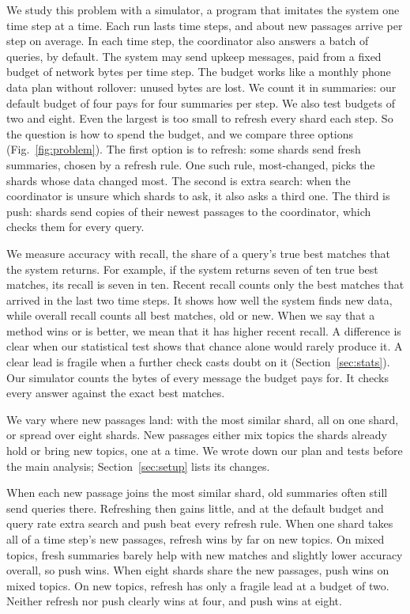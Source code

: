 We study this problem with a simulator, a program that imitates the system one time step at a time.
Each run lasts \RNumNumEpochs{} time steps, and about \RNumSteadyEpochInsertVecs{} new passages arrive per step on average.
In each time step, the coordinator also answers a batch of queries, \RNumPlainQueriesDefault{} by default.
The system may send upkeep messages, paid from a fixed budget of network bytes per time step.
The budget works like a monthly phone data plan without rollover: unused bytes are lost.
We count it in summaries: our default budget of four pays for four summaries per step.
We also test budgets of two and eight.
Even the largest is too small to refresh every shard each step.
So the question is how to spend the budget, and we compare three options (Fig.~\ref{fig:problem}).
The first option is to refresh: some shards send fresh summaries, chosen by a refresh rule.
One such rule, most-changed, picks the shards whose data changed most.
The second is extra search: when the coordinator is unsure which shards to ask, it also asks a third one.
The third is push: shards send copies of their newest passages to the coordinator, which checks them for every query.

We measure accuracy with recall, the share of a query's true best matches that the system returns.
For example, if the system returns seven of ten true best matches, its recall is seven in ten.
Recent recall counts only the best matches that arrived in the last two time steps.
It shows how well the system finds new data, while overall recall counts all best matches, old or new.
When we say that a method wins or is better, we mean that it has higher recent recall.
A difference is clear when our statistical test shows that chance alone would rarely produce it.
A clear lead is fragile when a further check casts doubt on it (Section~\ref{sec:stats}).
Our simulator counts the bytes of every message the budget pays for.
It checks every answer against the exact best matches.

We vary where new passages land: with the most similar shard, all on one shard, or spread over eight shards.
New passages either mix topics the shards already hold or bring new topics, one at a time.
We wrote down our plan and tests before the main analysis; Section~\ref{sec:setup} lists its changes.

When each new passage joins the most similar shard, old summaries often still send queries there.
Refreshing then gains little, and at the default budget and query rate extra search and push beat every refresh rule.
When one shard takes all of a time step's new passages, refresh wins by far on new topics.
On mixed topics, fresh summaries barely help with new matches and slightly lower accuracy overall, so push wins.
When eight shards share the new passages, push wins on mixed topics.
On new topics, refresh has only a fragile lead at a budget of two.
Neither refresh nor push clearly wins at four, and push wins at eight.

